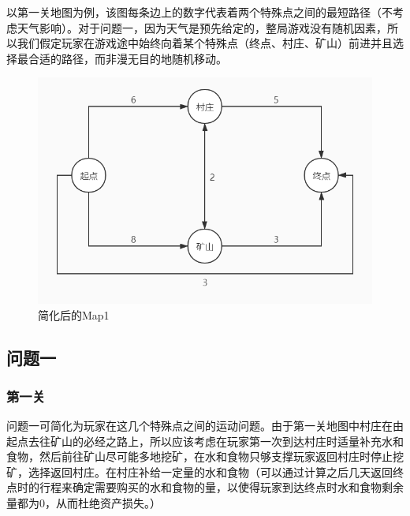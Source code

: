 \documentclass[withoutpreface,bwprint]{cumcmthesis} %
\begin{document}
以第一关地图为例，该图每条边上的数字代表着两个特殊点之间的最短路径（不考虑天气影响）。对于问题一，因为天气是预先给定的，整局游戏没有随机因素，所以我们假定玩家在游戏途中始终向着某个特殊点（终点、村庄、矿山）前进并且选择最合适的路径，而非漫无目的地随机移动。
\begin{figure}[H]
	\centering
	\includegraphics[scale=0.4]{figures/map1newer.jpg}
	\caption{简化后的Map1}
	\label{fig:map1}
\end{figure}

\subsection{问题一}

\subsubsection{第一关}
问题一可简化为玩家在这几个特殊点之间的运动问题。由于第一关地图中村庄在由起点去往矿山的必经之路上，所以应该考虑在玩家第一次到达村庄时适量补充水和食物，然后前往矿山尽可能多地挖矿，在水和食物只够支撑玩家返回村庄时停止挖矿，选择返回村庄。在村庄补给一定量的水和食物（可以通过计算之后几天返回终点时的行程来确定需要购买的水和食物的量，以使得玩家到达终点时水和食物剩余量都为0，从而杜绝资产损失。）
\end{document}
